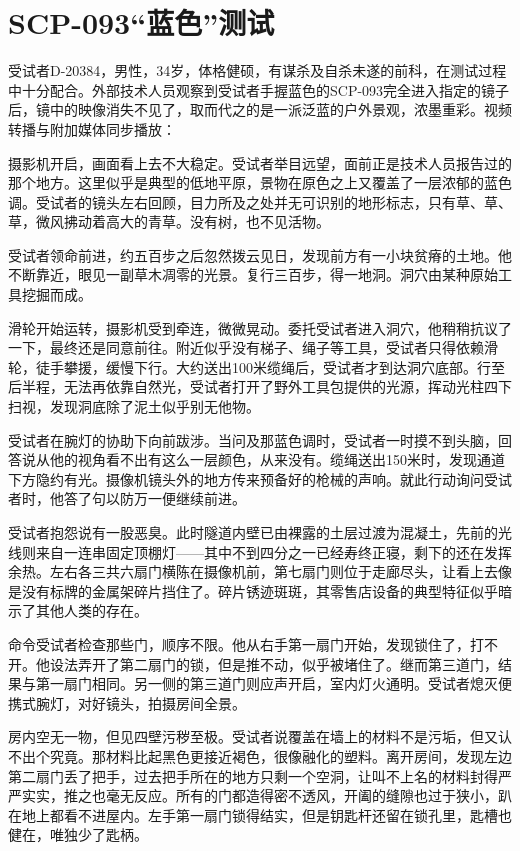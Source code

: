 \section{SCP-093“蓝色”测试}

\label{sec:DOC-scp-093-blue-test}


受试者D-20384，男性，34岁，体格健硕，有谋杀及自杀未遂的前科，在测试过程中十分配合。外部技术人员观察到受试者手握蓝色的SCP-093完全进入指定的镜子后，镜中的映像消失不见了，取而代之的是一派泛蓝的户外景观，浓墨重彩。视频转播与附加媒体同步播放：

\begin{scpbox}

摄影机开启，画面看上去不大稳定。受试者举目远望，面前正是技术人员报告过的那个地方。这里似乎是典型的低地平原，景物在原色之上又覆盖了一层浓郁的蓝色调。受试者的镜头左右回顾，目力所及之处并无可识别的地形标志，只有草、草、草，微风拂动着高大的青草。没有树，也不见活物。

受试者领命前进，约五百步之后忽然拨云见日，发现前方有一小块贫瘠的土地。他不断靠近，眼见一副草木凋零的光景。复行三百步，得一地洞。洞穴由某种原始工具挖掘而成。

滑轮开始运转，摄影机受到牵连，微微晃动。委托受试者进入洞穴，他稍稍抗议了一下，最终还是同意前往。附近似乎没有梯子、绳子等工具，受试者只得依赖滑轮，徒手攀援，缓慢下行。大约送出100米缆绳后，受试者才到达洞穴底部。行至后半程，无法再依靠自然光，受试者打开了野外工具包提供的光源，挥动光柱四下扫视，发现洞底除了泥土似乎别无他物。

受试者在腕灯的协助下向前跋涉。当问及那蓝色调时，受试者一时摸不到头脑，回答说从他的视角看不出有这么一层颜色，从来没有。缆绳送出150米时，发现通道下方隐约有光。摄像机镜头外的地方传来预备好的枪械的声响。就此行动询问受试者时，他答了句以防万一便继续前进。

受试者抱怨说有一股恶臭。此时隧道内壁已由裸露的土层过渡为混凝土，先前的光线则来自一连串固定顶棚灯——其中不到四分之一已经寿终正寝，剩下的还在发挥余热。左右各三共六扇门横陈在摄像机前，第七扇门则位于走廊尽头，让看上去像是没有标牌的金属架碎片挡住了。碎片锈迹斑斑，其零售店设备的典型特征似乎暗示了其他人类的存在。

命令受试者检查那些门，顺序不限。他从右手第一扇门开始，发现锁住了，打不开。他设法弄开了第二扇门的锁，但是推不动，似乎被堵住了。继而第三道门，结果与第一扇门相同。另一侧的第三道门则应声开启，室内灯火通明。受试者熄灭便携式腕灯，对好镜头，拍摄房间全景。

房内空无一物，但见四壁污秽至极。受试者说覆盖在墙上的材料不是污垢，但又认不出个究竟。那材料比起黑色更接近褐色，很像融化的塑料。离开房间，发现左边第二扇门丢了把手，过去把手所在的地方只剩一个空洞，让叫不上名的材料封得严严实实，推之也毫无反应。所有的门都造得密不透风，开阖的缝隙也过于狭小，趴在地上都看不进屋内。左手第一扇门锁得结实，但是钥匙杆还留在锁孔里，匙槽也健在，唯独少了匙柄。


\end{scpbox}
